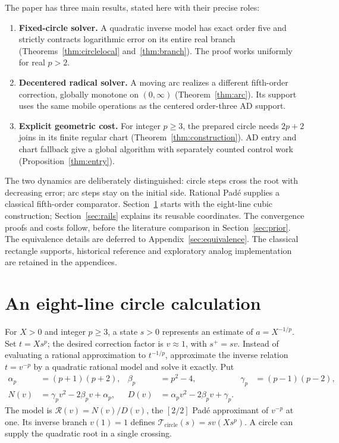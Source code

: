 \documentclass[11pt,a4paper]{article}
\newcommand{\map}[1]{\mathcal T_{\mathrm{#1}}}
\begin{document}
The paper has three main results, stated here with their precise roles:
\begin{enumerate}
\item \textbf{Fixed-circle solver.} A quadratic inverse model has exact order five and strictly contracts logarithmic error on its entire real branch (Theorems~\ref{thm:circlelocal} and~\ref{thm:branch}). The proof works uniformly for real $p>2$.
\item \textbf{Decentered radical solver.} A moving arc realizes a different fifth-order correction, globally monotone on $(0,\infty)$ (Theorem~\ref{thm:arc}). Its support uses the same mobile operations as the centered order-three AD support.
\item \textbf{Explicit geometric cost.} For integer $p\ge3$, the prepared circle needs $2p+2$ joins in its finite regular chart (Theorem~\ref{thm:construction}). AD entry and chart fallback give a global algorithm with separately counted control work (Proposition~\ref{thm:entry}).
\end{enumerate}
The two dynamics are deliberately distinguished: circle steps cross the root with decreasing error; arc steps stay on the initial side. Rational Pad\'e supplies a classical fifth-order comparator. Section~\ref{sec:firstcircle} starts with the eight-line cubic construction; Section~\ref{sec:rails} explains its reusable coordinates. The convergence proofs and costs follow, before the literature comparison in Section~\ref{sec:prior}. The equivalence details are deferred to Appendix~\ref{sec:equivalence}. The classical rectangle supports, historical reference and exploratory analog implementation are retained in the appendices.

\clearpage
\section{An eight-line circle calculation}\label{sec:firstcircle}
For $X>0$ and integer $p\ge3$, a state $s>0$ represents an estimate of $a=X^{-1/p}$. Set $t=Xs^p$; the desired correction factor is $v\approx1$, with $s^+=sv$. Instead of evaluating a rational approximation to $t^{-1/p}$, approximate the inverse relation $t=v^{-p}$ by a quadratic rational model and solve it exactly. Put
\begin{align}
 \alpha_p&=(p+1)(p+2),&\beta_p&=p^2-4,&\gamma_p&=(p-1)(p-2),\nonumber\\
 N(v)&=\gamma_pv^2-2\beta_pv+\alpha_p,&
 D(v)&=\alpha_pv^2-2\beta_pv+\gamma_p.\label{eq:model}
\end{align}
The model is $\mathcal R(v)=N(v)/D(v)$, the $[2/2]$ Pad\'e approximant of $v^{-p}$ at one. Its inverse branch $v(1)=1$ defines $\map{circle}(s)=sv(Xs^p)$. A circle can supply the quadratic root in a single crossing.
\end{document}

